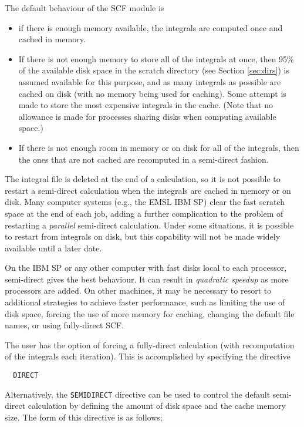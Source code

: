 The default behaviour of the SCF module is
\begin{itemize}
\item if there is enough memory available, the integrals are computed
   once and cached in memory.
 \item If there is not enough memory to store all of the integrals at
   once, then 95\% of the available disk space in the scratch
   directory (see Section \ref{sec:dirs}) is assumed available for
   this purpose, and as many integrals as possible are cached on disk
   (with no memory being used for caching).  Some attempt is made to
   store the most expensive integrals in the cache.  (Note that no
   allowance is made for processes sharing disks when computing
   available space.)
 \item If there is not enough room in memory or on disk for all of the
   integrals, then the ones that are not cached are recomputed in a
   semi-direct fashion.
\end{itemize}

The integral file is deleted at the end of a calculation, so it is not
possible to restart a semi-direct calculation when the integrals are
cached in memory or on disk.  Many computer systems (e.g., the EMSL
IBM SP) clear the fast scratch space at the end of each job, adding a
further complication to the problem of restarting a {\em parallel}
semi-direct calculation.  Under some situations, it is possible to
restart from integrals on disk, but this capability will not be made
widely available until a later date.

On the IBM SP or any other computer with fast disks local to each
processor, semi-direct gives the best behaviour.  It can result in
{\em quadratic speedup} as more processors are added.  On other
machines, it may be necessary to resort to additional strategies to
achieve faster performance, such as limiting the use of disk space,
forcing the use of more memory for caching, changing the default file
names, or using fully-direct SCF.

The user has the option of forcing a fully-direct calculation (with
recomputation of the integrals each iteration).  This is accomplished
by specifying the directive

\begin{verbatim}
  DIRECT
\end{verbatim}

Alternatively, the \verb+SEMIDIRECT+ directive can be used to control
the default semi-direct calculation by defining the amount of disk
space and the cache memory size.  The form of this directive is as
follows;

